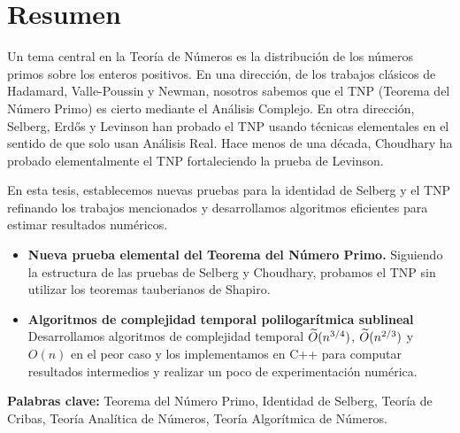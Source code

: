 \chapter*{Resumen}
Un tema central en la Teor\'ia de N\'umeros es
la distribuci\'on de los n\'umeros primos sobre los enteros positivos.
En una direcci\'on, de los trabajos cl\'asicos de
Hadamard, Valle-Poussin y Newman,
nosotros sabemos que el TNP (Teorema del N\'umero Primo)
es cierto mediante el An\'alisis Complejo.
En otra direcci\'on,
Selberg, Erdős y Levinson
han probado el TNP
usando t\'ecnicas elementales en el sentido
de que solo usan An\'alisis Real.
Hace menos de una d\'ecada,
Choudhary ha probado elementalmente el TNP
fortaleciendo la prueba de Levinson.

En esta tesis,
establecemos nuevas pruebas para
la identidad de Selberg
y el TNP
refinando los trabajos mencionados
y desarrollamos algoritmos eficientes para estimar resultados num\'ericos.

\begin{itemize}
    \item
    \textbf{Nueva prueba elemental del Teorema del N\'umero Primo.}
    Siguiendo la estructura de las pruebas de Selberg y Choudhary,
    probamos el TNP sin utilizar los teoremas tauberianos de Shapiro.

    \item
    \textbf{Algoritmos de complejidad temporal polilogar\'itmica sublineal}
    Desarrollamos algoritmos de complejidad temporal
    \(\widetilde{O}(n^{3/4})\), \(\widetilde{O}(n^{2/3})\) y \(O(n)\)
    en el peor caso y los implementamos en C++
    para computar resultados intermedios y
    realizar un poco de experimentaci\'on num\'erica.
\end{itemize}

\bigskip
\textbf{Palabras clave:}
Teorema del N\'umero Primo,
Identidad de Selberg,
Teor\'ia de Cribas,
Teor\'ia Anal\'itica de N\'umeros,
Teor\'ia Algor\'itmica de N\'umeros.
